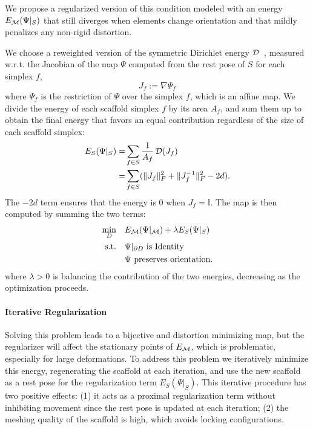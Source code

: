  We propose a regularized version of this condition modeled with an energy $E_{\operatorname{\mathcal{M}}} (\Psi|_{S})$ that still diverges when elements change orientation and that mildly penalizes any non-rigid distortion.
 
 We choose a reweighted version of the symmetric Dirichlet energy $\operatorname{\mathcal{D}}$~\cite{Smith:2015}, measured w.r.t. the Jacobian of the map $\Psi$ computed from the rest pose of $S$ for each simplex $f$,
\begin{equation}
    J_f := \nabla \Psi_f
\end{equation}
where $\Psi_f$ is the restriction of $\Psi$ over the simplex $f$, which is an affine map. We divide the energy of each scaffold simplex $f$ by its area $A_f$, and sum them up to obtain the final energy that favors an equal contribution regardless of the size of each scaffold simplex:
\begin{align}
    \begin{split}
    E_S(\Psi|_{S}) =&\sum_{f\in S} \frac{1}{A_f} \operatorname{\mathcal{D}}(J_f) \\
    =&\sum_{f\in S} (\lVert J_f \rVert_F^2 + \lVert J^{-1}_f \rVert_F^2 -2d).
    \end{split}
\end{align}
The $-2d$ term ensures that the energy is 0 when $J_f = \mathbb{I}$. The map is then computed by summing the two terms:
\begin{align}
\begin{split}\label{eq:variational}
\min_{D} & \quad E_{\operatorname{\mathcal{M}}}(\Psi|_{\operatorname{\mathcal{M}}}) + \lambda E_{S} (\Psi|_{S}) \\
    \text{s.t.} & \quad \Psi|_{\partial D} {\text{ is Identity}} \\ 
    & \quad \Psi \text{ preserves orientation}.
\end{split}
\end{align}
where $\lambda > 0$ is balancing the contribution of the two energies, decreasing as the optimization proceeds.

\paragraph{Iterative Regularization}
Solving this problem leads to a bijective and distortion minimizing map, but the regularizer will affect the stationary points of $E_{\operatorname{\mathcal{M}}}$, which is problematic, especially for large deformations.
%
To address this problem we iteratively minimize this energy, regenerating the scaffold at each iteration, and use the new scaffold as a rest pose for the regularization term $E_{S} (\Psi|_{S})$. This iterative procedure has two positive effects: (1) it acts as a proximal regularization term without inhibiting movement since the rest pose is updated at each iteration; (2) the meshing quality of the scaffold is high, which avoids locking configurations.

